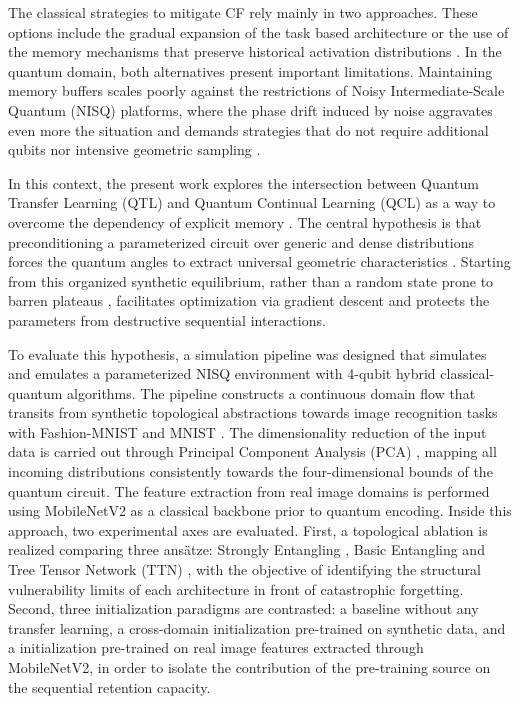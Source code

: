 \documentclass[conference]{IEEEtran}
\begin{document}
The classical strategies to mitigate CF rely mainly in two approaches. These options include the gradual expansion of the task based architecture or the use of the memory mechanisms that preserve historical activation distributions \cite{buzzega2020dark,kirkpatrick2017overcoming}. In the quantum domain, both alternatives present important limitations. Maintaining memory buffers scales poorly against the restrictions of Noisy Intermediate-Scale Quantum (NISQ) platforms, where the phase drift induced by noise aggravates even more the situation and demands strategies that do not require additional qubits nor intensive geometric sampling \cite{mcclean2018barren,pesah2021absence}.

In this context, the present work explores the intersection between Quantum Transfer Learning (QTL) and Quantum Continual Learning (QCL) as a way to overcome the dependency of explicit memory \cite{mari2020transfer,pan2009survey}. The central hypothesis is that preconditioning a parameterized circuit over generic and dense distributions forces the quantum angles to extract universal geometric characteristics  \cite{cerezo2021variational,sim2019expressibility}. Starting from this organized synthetic equilibrium, rather than a random state prone to barren plateaus \cite{mcclean2018barren}, facilitates optimization via gradient descent and protects the parameters from destructive sequential interactions.

To evaluate this hypothesis, a simulation pipeline was designed that simulates and emulates a parameterized NISQ environment with 4-qubit hybrid classical-quantum algorithms. The pipeline constructs a continuous domain flow that transits from synthetic topological abstractions towards image recognition tasks with Fashion-MNIST \cite{Xiao17} and MNIST \cite{Lecun98}. The dimensionality reduction of the input data is carried out through Principal Component Analysis (PCA) \cite{pearson1901lines}, mapping all incoming distributions consistently towards the four-dimensional bounds of the quantum circuit. The feature extraction from real image domains is performed using MobileNetV2 \cite{Sandler18} as a classical backbone prior to quantum encoding. Inside this approach, two experimental axes are evaluated. First, a topological ablation is realized comparing three ansätze: Strongly Entangling \cite{sim2019expressibility}, Basic Entangling and Tree Tensor Network (TTN) \cite{grant2018hierarchical}, with the objective of identifying the structural vulnerability limits of each architecture in front of catastrophic forgetting. Second, three initialization paradigms are contrasted: a baseline without any transfer learning, a cross-domain initialization pre-trained on synthetic data, and a initialization pre-trained on real image features extracted through MobileNetV2, in order to isolate the contribution of the pre-training source on the sequential retention capacity.
\end{document}
